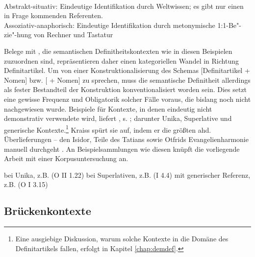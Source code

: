 \begin{exe}
	\ex 
	\begin{xlist} \label{ex:sem-def}
		\ex \label{ex:sem-def1}  \\ Abstrakt-situativ: Eindeutige Identifikation durch Weltwissen; es gibt nur einen in Frage kommenden Referenten. 
		\ex \label{ex:sem-def2}   \\ Assoziativ-anaphorisch: Eindeutige Identifikation durch metonymische 1:1-Be"-zie"-hung von Rechner und Tastatur
		\end{xlist}
\end{exe}
\noindent
Belege mit , die semantischen Definitheitskontexten wie in diesen Beispielen zuzuordnen sind, repräsentieren daher einen kategoriellen Wandel in Richtung Definitartikel. Um von einer Konstruktionalisierung des Schemas [Definitartikel + Nomen] bzw. [  + Nomen] zu sprechen, muss die semantische Definitheit allerdings als fester Bestandteil der Konstruktion konventionalisiert worden sein. Dies setzt eine gewisse Frequenz und Obligatorik solcher Fälle voraus, die bislang noch nicht nachgewiesen wurde. Beispiele für Kontexte, in denen  eindeutig nicht demonstrativ verwendete wird, liefert \textcite[135ff.]{Kraiss2014}, s. ; darunter Unika, Superlative und generische Kontexte.\footnote{Eine ausgiebige Diskussion, warum solche Kontexte in die Domäne des Definitartikels fallen, erfolgt in Kapitel \ref{chap:demdef}.}  Kraiss spürt sie auf, indem er  die größten ahd. Überlieferungen -- den Isidor, Teile des Tatians sowie Otfrids Evangelienharmonie manuell durchgeht \parencite{Kraiss2012}. An Beispielsammlungen wie diesen \parencite[vgl. z.B. auch][]{Luhr2008,Schlachter2015} knüpft die vorliegende Arbeit mit einer Korpusuntersuchung an. 

\begin{exe}
	\ex 
	\begin{xlist} \label{ex:kraiss}
		\ex \label{ex:kraiss-unika}  bei Unika, z.B.  (O II 1.22) 
		\ex \label{ex:kraiss-superlativ}  bei Superlativen, z.B.  (I 4.4)
				\ex \label{ex:kraiss-generisch}  mit generischer Referenz, z.B.  (O I 3.15)
		\end{xlist}
\end{exe}

\subsection{Brückenkontexte} \label{sec:bruecke}

